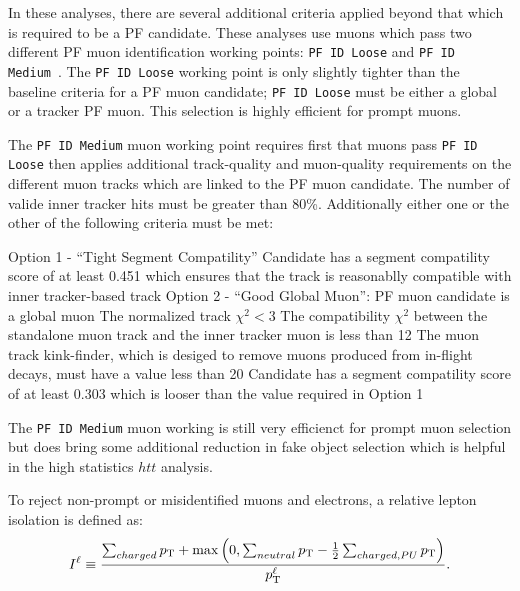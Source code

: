In these analyses, there are several additional criteria applied beyond that which is required to
be a PF candidate. These analyses use muons which pass two different PF muon identification working
points: \texttt{PF ID Loose} and \texttt{PF ID Medium}~\cite{sm-htt-2017}. The \texttt{PF ID Loose}
working point is only slightly tighter than the baseline criteria for a PF muon candidate; 
\texttt{PF ID Loose} must be either a global or a tracker PF muon. This selection is highly efficient
for prompt muons.

The \texttt{PF ID Medium} muon working point requires first that muons pass \texttt{PF ID Loose} then
applies additional track-quality and muon-quality requirements on the different muon tracks which are
linked to the PF muon candidate. The number of valide inner tracker
hits must be greater than 80\%. Additionally either one or the other of the following criteria must be met:
\begin{outline}
\1 Option 1 - ``Tight Segment Compatility''
    \2 Candidate has a segment compatility score of at least 0.451 which ensures that the 
track is reasonablly compatible with inner tracker-based track
\1 Option 2 - ``Good Global Muon'':
    \2 PF muon candidate is a global muon
    \2 The normalized track $\chi^2 < 3$
    \2 The compatibility $\chi^2$ between the standalone muon track and the inner tracker muon is
less than 12
    \2 The muon track kink-finder, which is desiged to remove muons produced from in-flight decays, 
must have a value less than 20
    \2 Candidate has a segment compatility score of at least 0.303 which is looser than the value
required in Option 1
\end{outline}
The \texttt{PF ID Medium} muon working is still very efficienct for prompt muon selection but
does bring some additional reduction in fake object selection which is helpful in the high
statistics $htt$ analysis. 

To reject non-prompt or misidentified muons and electrons, a relative lepton isolation is defined as:
\begin{equation}
I^{\ell} \equiv \frac{\sum_{charged}  p_\mathrm{T} + \max\left( 0, \sum_{neutral}  p_\mathrm{T}
                                         - \frac{1}{2} \sum_{charged, PU} p_\mathrm{T}  \right )}{p_\mathrm{T}^{\ell}}.
\label{eq:rel_isolation}
\end{equation}

